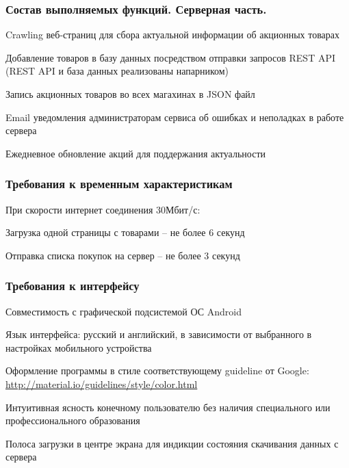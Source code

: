 \subsubsection{Состав выполняемых функций. Серверная часть.}
\begin{my_enumerate}
\item Crawling веб-страниц для сбора актуальной информации об акционных товарах
\item Добавление товаров в базу данных посредством отправки запросов REST API (REST API и база данных реализованы напарником)
\item Запись акционных товаров во всех магахинах в JSON файл
\item Email уведомления администраторам сервиса об ошибках и неполадках в работе сервера
\item Ежедневное обновление акций для поддержания актуальности
\end{my_enumerate}

\subsubsection{Требования к временным характеристикам}
При скорости интернет соединения 30Мбит/с:
\begin{my_enumerate}
\item Загрузка одной страницы с товарами -- не более 6 секунд
\item Отправка списка покупок на сервер -- не более 3 секунд
\end{my_enumerate}

\subsubsection{Требования к интерфейсу}
\begin{my_enumerate}
\item Совместимость с графической подсистемой ОС Android {\textregistered}
\item Язык интерфейса: русский и английский, в зависимости от выбранного в настройках мобильного устройства
\item Оформление программы в стиле соответствующему guideline от Google: \url{http://material.io/guidelines/style/color.html}
\item Интуитивная ясность конечному пользователю без наличия специального или профессионального образования
\item Полоса загрузки в центре экрана для индикции состояния скачивания данных с сервера
\end{my_enumerate}

